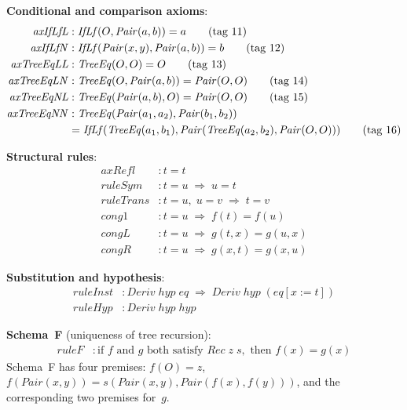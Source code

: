 \documentclass[11pt]{article}
\begin{document}
\noindent\textbf{Conditional and comparison axioms}:
\begin{align}
  \mathit{axIfLfL}&: \mathit{IfLf}(O, \mathit{Pair}(a,b)) = a \tag{tag 11}\\
  \mathit{axIfLfN}&: \mathit{IfLf}(\mathit{Pair}(x,y), \mathit{Pair}(a,b)) = b \tag{tag 12}\\
  \mathit{axTreeEqLL}&: \mathit{TreeEq}(O, O) = O \tag{tag 13}\\
  \mathit{axTreeEqLN}&: \mathit{TreeEq}(O, \mathit{Pair}(a,b)) = \mathit{Pair}(O,O) \tag{tag 14}\\
  \mathit{axTreeEqNL}&: \mathit{TreeEq}(\mathit{Pair}(a,b), O) = \mathit{Pair}(O,O) \tag{tag 15}\\
  \mathit{axTreeEqNN}&: \mathit{TreeEq}(\mathit{Pair}(a_1,a_2), \mathit{Pair}(b_1,b_2)) \notag\\
    &= \mathit{IfLf}(\mathit{TreeEq}(a_1,b_1),
       \mathit{Pair}(\mathit{TreeEq}(a_2,b_2), \mathit{Pair}(O,O))) \tag{tag 16}
\end{align}

\noindent\textbf{Structural rules}:
\begin{align}
  \mathit{axRefl}&: t = t \tag{tag 17}\\
  \mathit{ruleSym}&: t = u \;\Rightarrow\; u = t \tag{tag 18}\\
  \mathit{ruleTrans}&: t = u,\; u = v \;\Rightarrow\; t = v \tag{tag 19}\\
  \mathit{cong1}&: t = u \;\Rightarrow\; f(t) = f(u) \tag{tag 20}\\
  \mathit{congL}&: t = u \;\Rightarrow\; g(t,x) = g(u,x) \tag{tag 21}\\
  \mathit{congR}&: t = u \;\Rightarrow\; g(x,t) = g(x,u) \tag{tag 22}
\end{align}

\noindent\textbf{Substitution and hypothesis}:
\begin{align}
  \mathit{ruleInst}&: \mathit{Deriv}\;\mathit{hyp}\;\mathit{eq}
    \;\Rightarrow\; \mathit{Deriv}\;\mathit{hyp}\;(\mathit{eq}[x := t])
    \tag{tag 23}\\
  \mathit{ruleHyp}&: \mathit{Deriv}\;\mathit{hyp}\;\mathit{hyp}
    \tag{--}
\end{align}

\noindent\textbf{Schema~F} (uniqueness of tree recursion):
\begin{align}
  \mathit{ruleF}&: \text{if } f \text{ and } g \text{ both satisfy }
    \mathit{Rec}\;z\;s, \text{ then } f(x) = g(x) \tag{tag 24}
\end{align}
Schema~F has four premises: $f(O) = z$, $f(\mathit{Pair}(x,y)) =
s(\mathit{Pair}(x,y), \mathit{Pair}(f(x), f(y)))$, and the corresponding
two premises for~$g$.
\end{document}
